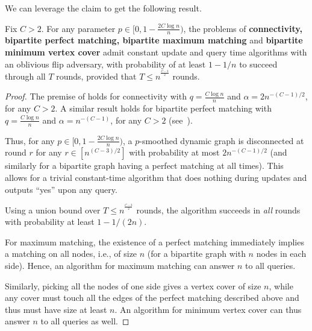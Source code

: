 \documentclass[letter,11pt]{article}
\begin{document}
We can leverage the claim to get the following result.
\begin{claim}
    \label{claim:ub_oblivious_flip}
    Fix $C > 2$. For any parameter $p\in[0,1-\frac{2C\log n}{n})$, the problems of 
     \textbf{connectivity, bipartite perfect matching, bipartite maximum matching} and \textbf{bipartite minimum vertex cover}
     admit constant update and query time algorithms with an oblivious flip adversary, with probability of at least $1-1/n$ to succeed through all $T$ rounds, provided that $T \leq n^{^{\frac{C-3}{2}}}$ rounds.
\end{claim}

\begin{proof}
    The premise of  holds for connectivity with $q = \frac{C\log n}{n}$ and $\alpha = 2n^{-(C-1)/2}$, for any $C > 2$.
    A similar result holds for bipartite perfect matching with $q = \frac{C\log n}{n}$ and $\alpha = n^{-(C-1)}$, for any $C > 2$ (see~\cite[Remark 4.3]{books:random_graphs_janson2011}).

    Thus, for any $p\in[0,1-\frac{2C\log n}{n})$, a $p$-smoothed dynamic graph is disconnected at round $r$ for any $r\in[n^{(C-3)/2}]$ with probability at most $2n^{-(C-1)/2}$ (and similarly for a bipartite graph having a perfect matching at all times). This allows for a trivial constant-time algorithm that does nothing during updates and outputs ``yes'' upon any query.    
    
    Using a union bound over $T \leq n^{^{\frac{C-3}{2}}}$ rounds, the algorithm succeeds in \emph{all} rounds with probability at least $1 - 1/(2n)$.
    
    For maximum matching, the existence of a perfect matching immediately implies a matching on all nodes, i.e., of size $n$ (for a bipartite graph with $n$ nodes in each side).
    Hence, an algorithm for maximum matching can answer $n$ to all queries.
    
    Similarly, picking all the nodes of one side gives a vertex cover of size $n$, while any cover must touch all the edges of the perfect matching described above and thus must have size at least $n$.
    An algorithm for minimum vertex cover can thus answer $n$ to all queries as well.
\end{proof}
\end{document}
